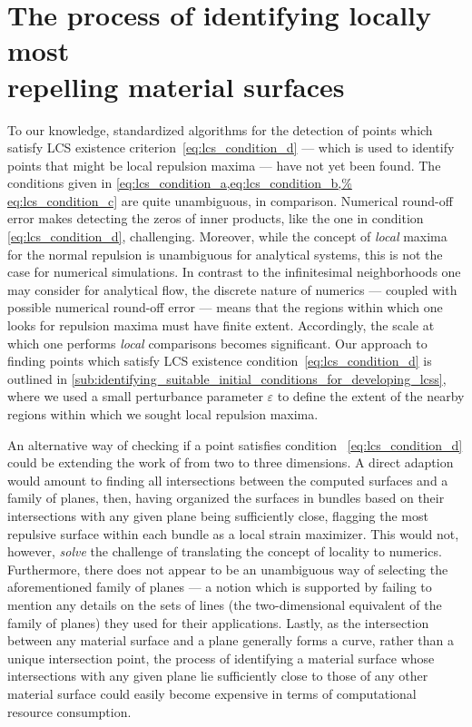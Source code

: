 \section[The process of identifying locally most repelling material
surfaces]{The process of identifying locally most \\\phantom{5.3} repelling
    material surfaces}
\label{sec:the_process_of_identifying_locally_most_normally_repelling_%
material_surfaces}

To our knowledge, standardized algorithms for the detection of points which
satisfy LCS existence criterion~\eqref{eq:lcs_condition_d} --- which is used to
identify points that might be local repulsion maxima --- have not yet been
found. The conditions given in \cref{eq:lcs_condition_a,eq:lcs_condition_b,%
eq:lcs_condition_c} are quite unambiguous, in comparison. Numerical round-off
error makes detecting the zeros of inner products, like the one in condition~%
\eqref{eq:lcs_condition_d}, challenging. Moreover, while the concept of
\emph{local} maxima for the normal repulsion is unambiguous for analytical
systems, this is not the case for numerical simulations. In contrast to the
infinitesimal neighborhoods one may consider for analytical flow, the discrete
nature of numerics --- coupled with possible numerical round-off error ---
means that the regions within which one looks for repulsion maxima must have
finite extent. Accordingly, the scale at which one performs \emph{local}
comparisons becomes significant. Our approach to finding points which satisfy
LCS existence condition~\eqref{eq:lcs_condition_d} is outlined in
\cref{sub:identifying_suitable_initial_conditions_for_developing_lcss}, where
we used a small perturbance parameter $\varepsilon$ to define the extent of the
nearby regions within which we sought local repulsion maxima.

An alternative way of checking if a point satisfies condition~%
\eqref{eq:lcs_condition_d} could be extending the work of
\textcite{farazmand2012computing} from two to three dimensions. A direct
adaption would amount to finding all intersections between the computed
surfaces and a family of planes, then, having organized the surfaces in bundles
based on their intersections with any given plane being sufficiently close,
flagging the most repulsive surface within each bundle as a local strain
maximizer. This would not, however, \emph{solve} the challenge of translating
the concept of locality to numerics. Furthermore, there does not appear to be
an unambiguous way of selecting the aforementioned family of planes --- a
notion which is supported by \citeauthor{farazmand2012computing} failing to
mention any details on the sets of lines (the two-dimensional equivalent of
the family of planes) they used for their applications. Lastly, as the
intersection between any material surface and a plane generally forms a
curve, rather than a unique intersection point, the process of identifying a
material surface whose intersections with any given plane lie sufficiently
close to those of any other material surface could easily become expensive in
terms of computational resource consumption.

